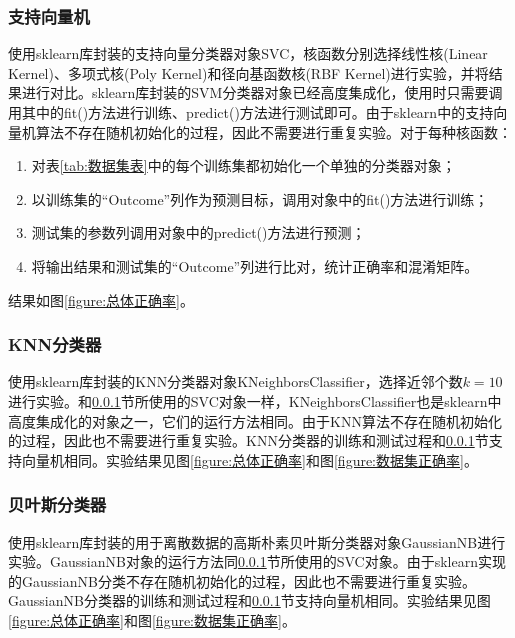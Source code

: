 \documentclass[a4paper]{ctexart}
\begin{document}
\subsubsection{支持向量机}\label{sec:SVM实践}
使用sklearn库封装的支持向量分类器对象SVC，核函数分别选择线性核(Linear Kernel)、多项式核(Poly Kernel)和径向基函数核(RBF Kernel)进行实验，并将结果进行对比。sklearn库封装的SVM分类器对象已经高度集成化，使用时只需要调用其中的fit()方法进行训练、predict()方法进行测试即可。由于sklearn中的支持向量机算法不存在随机初始化的过程，因此不需要进行重复实验。对于每种核函数：
\begin{enumerate}
	\item 对表\ref{tab:数据集表}中的每个训练集都初始化一个单独的分类器对象；
	\item 以训练集的“Outcome”列作为预测目标，调用对象中的fit()方法进行训练；
	\item 测试集的参数列调用对象中的predict()方法进行预测；
	\item 将输出结果和测试集的“Outcome”列进行比对，统计正确率和混淆矩阵。
\end{enumerate}
结果如图\ref{figure:总体正确率}。

\subsubsection{KNN分类器}\label{sec:KNN实践}
使用sklearn库封装的KNN分类器对象KNeighborsClassifier，选择近邻个数$k=10$进行实验。和\ref{sec:SVM实践}节所使用的SVC对象一样，KNeighborsClassifier也是sklearn中高度集成化的对象之一，它们的运行方法相同。由于KNN算法不存在随机初始化的过程，因此也不需要进行重复实验。KNN分类器的训练和测试过程和\ref{sec:SVM实践}节支持向量机相同。实验结果见图\ref{figure:总体正确率}和图\ref{figure:数据集正确率}。

\subsubsection{贝叶斯分类器}\label{sec:NB实践}
使用sklearn库封装的用于离散数据的高斯朴素贝叶斯分类器对象GaussianNB进行实验。GaussianNB对象的运行方法同\ref{sec:SVM实践}节所使用的SVC对象。由于sklearn实现的GaussianNB分类不存在随机初始化的过程，因此也不需要进行重复实验。GaussianNB分类器的训练和测试过程和\ref{sec:SVM实践}节支持向量机相同。实验结果见图\ref{figure:总体正确率}和图\ref{figure:数据集正确率}。
\end{document}
